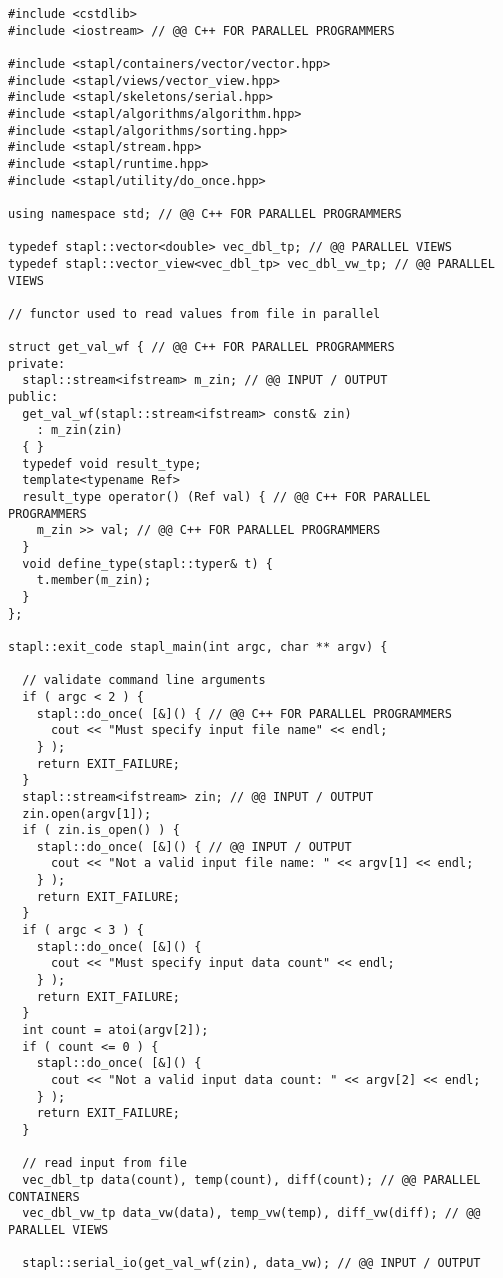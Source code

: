 \small
\begin{verbatim}
#include <cstdlib>
#include <iostream> // @@ C++ FOR PARALLEL PROGRAMMERS

#include <stapl/containers/vector/vector.hpp>
#include <stapl/views/vector_view.hpp>
#include <stapl/skeletons/serial.hpp>
#include <stapl/algorithms/algorithm.hpp>
#include <stapl/algorithms/sorting.hpp>
#include <stapl/stream.hpp>
#include <stapl/runtime.hpp>
#include <stapl/utility/do_once.hpp>

using namespace std; // @@ C++ FOR PARALLEL PROGRAMMERS

typedef stapl::vector<double> vec_dbl_tp; // @@ PARALLEL VIEWS
typedef stapl::vector_view<vec_dbl_tp> vec_dbl_vw_tp; // @@ PARALLEL VIEWS

// functor used to read values from file in parallel

struct get_val_wf { // @@ C++ FOR PARALLEL PROGRAMMERS
private:
  stapl::stream<ifstream> m_zin; // @@ INPUT / OUTPUT
public:
  get_val_wf(stapl::stream<ifstream> const& zin)
    : m_zin(zin)
  { }
  typedef void result_type;
  template<typename Ref>
  result_type operator() (Ref val) { // @@ C++ FOR PARALLEL PROGRAMMERS
    m_zin >> val; // @@ C++ FOR PARALLEL PROGRAMMERS
  }
  void define_type(stapl::typer& t) {
    t.member(m_zin);
  }
};

stapl::exit_code stapl_main(int argc, char ** argv) {

  // validate command line arguments
  if ( argc < 2 ) {
    stapl::do_once( [&]() { // @@ C++ FOR PARALLEL PROGRAMMERS
      cout << "Must specify input file name" << endl;
    } );
    return EXIT_FAILURE;
  }
  stapl::stream<ifstream> zin; // @@ INPUT / OUTPUT
  zin.open(argv[1]);
  if ( zin.is_open() ) {
    stapl::do_once( [&]() { // @@ INPUT / OUTPUT
      cout << "Not a valid input file name: " << argv[1] << endl;
    } );
    return EXIT_FAILURE;
  }
  if ( argc < 3 ) {
    stapl::do_once( [&]() {
      cout << "Must specify input data count" << endl;
    } );
    return EXIT_FAILURE;
  }
  int count = atoi(argv[2]);
  if ( count <= 0 ) {
    stapl::do_once( [&]() {
      cout << "Not a valid input data count: " << argv[2] << endl;
    } );
    return EXIT_FAILURE;
  }

  // read input from file
  vec_dbl_tp data(count), temp(count), diff(count); // @@ PARALLEL CONTAINERS
  vec_dbl_vw_tp data_vw(data), temp_vw(temp), diff_vw(diff); // @@ PARALLEL VIEWS

  stapl::serial_io(get_val_wf(zin), data_vw); // @@ INPUT / OUTPUT


\end{verbatim}
